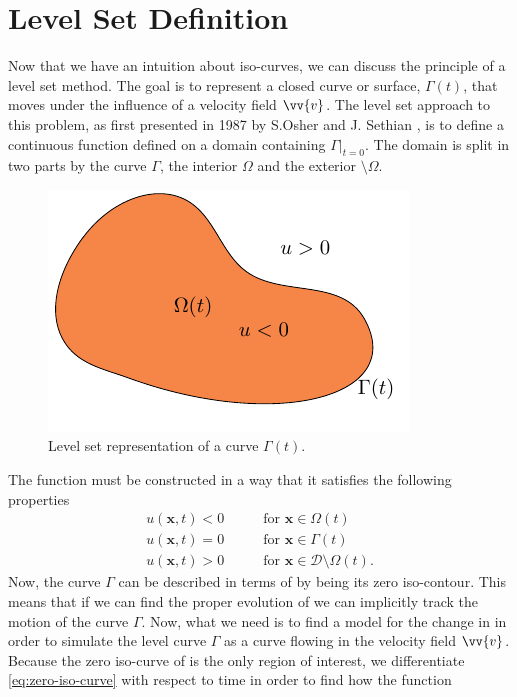 \section{Level Set Definition}
Now that we have an intuition about iso-curves, we can discuss the principle
of a level set method. The goal is to represent a closed curve or surface, 
$\Gamma(t)$, that moves under the influence of a velocity field $\vv{v}$.
The level set approach to this problem, as first presented in 1987 by 
S.Osher and J. Sethian \cite{Osher-Sethian}, is to define a continuous function
\uxt defined on a domain \domain containing $\Gamma|_{t=0}$.
The domain \domain is split in two parts by the curve $\Gamma$, the interior
$\Omega$ and the exterior \domain $\setminus \Omega$. 
\begin{figure}
    \centering
    \includegraphics[width=.5\linewidth]{figures/tikz-figures/optimization-problem.pdf}
    \caption{Level set representation of a curve $\Gamma (t)$.}
    \label{fig:levelset-representation}
\end{figure}
The function \uxt must be constructed in a way that it satisfies the following properties
\begin{align}
    u(\mathbf{x}, t) < 0 \qquad &\text{for } \mathbf{x} \in  \Omega(t) \label{eq:interior}\\
    u(\mathbf{x}, t) = 0 \qquad &\text{for } \mathbf{x} \in  \Gamma(t) \label{eq:zero-iso-curve}\\
    u(\mathbf{x}, t) > 0 \qquad &\text{for } \mathbf{x} \in  \mathcal{D} \setminus \Omega(t) \label{eq:exterior}.
\end{align}
Now, the curve $\Gamma$ can be described in terms of \uxt by being its 
zero iso-contour. This means that if we can find the proper evolution of 
\uxt we can implicitly track the motion of the curve $\Gamma$.
Now, what we need is to find a model for the change in \uxt in order
to simulate the level curve $\Gamma$ as a curve flowing in the velocity field $\vv{v}$.
Because the zero iso-curve of \uxt is the only region of interest, we differentiate 
\eqref{eq:zero-iso-curve} with respect to time in order to find how the function \uxt
